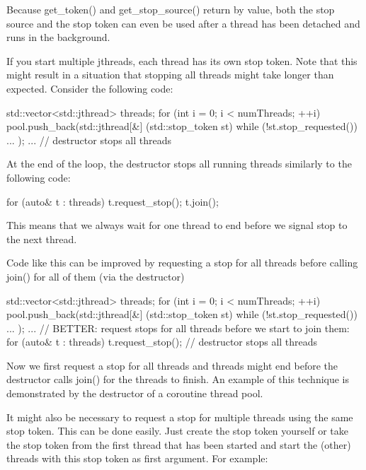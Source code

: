 Because get\_token() and get\_stop\_source() return by value, both the stop source and the stop token can even be used after a thread has been detached and runs in the background.


If you start multiple jthreads, each thread has its own stop token. Note that this might result in a situation that stopping all threads might take longer than expected. Consider the following code:

\begin{cpp}
{
	std::vector<std::jthread> threads;
	for (int i = 0; i < numThreads; ++i) {
		pool.push_back(std::jthread{[&] (std::stop_token st) {
				while (!st.stop_requested()) {
					...
				}
		}});
	}
	...
} // destructor stops all threads
\end{cpp}

At the end of the loop, the destructor stops all running threads similarly to the following code:

\begin{cpp}
for (auto& t : threads) {
	t.request_stop();
	t.join();
}
\end{cpp}

This means that we always wait for one thread to end before we signal stop to the next thread.

Code like this can be improved by requesting a stop for all threads before calling join() for all of them (via the destructor)

\begin{cpp}
{
	std::vector<std::jthread> threads;
	for (int i = 0; i < numThreads; ++i) {
		pool.push_back(std::jthread{[&] (std::stop_token st) {
				while (!st.stop_requested()) {
					...
				}
		}});
	}
	...
	// BETTER: request stops for all threads before we start to join them:
	for (auto& t : threads) {
		t.request_stop();
	}
} // destructor stops all threads
\end{cpp}

Now we first request a stop for all threads and threads might end before the destructor calls join() for the threads to finish. An example of this technique is demonstrated by the destructor of a coroutine thread pool.


It might also be necessary to request a stop for multiple threads using the same stop token. This can be done easily. Just create the stop token yourself or take the stop token from the first thread that has been started and start the (other) threads with this stop token as first argument. For example:


